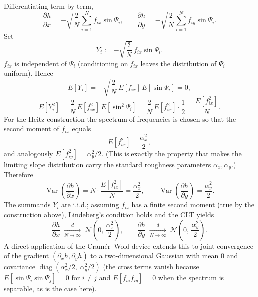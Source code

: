 \documentclass[a4paper,11pt]{article}
\begin{document}
Differentiating term by term,
\[
\frac{\partial h}{\partial x}
   = -\sqrt{\frac{2}{N}}\sum_{i=1}^N f_{ix}\sin\Psi_i,
\qquad
\frac{\partial h}{\partial y}
   = -\sqrt{\frac{2}{N}}\sum_{i=1}^N f_{iy}\sin\Psi_i.
\]
Set
\[
Y_i := -\sqrt{\frac{2}{N}}\,f_{ix}\sin\Psi_i.
\]
$f_{ix}$ is independent of $\Psi_i$ (conditioning on $f_{ix}$ leaves the
distribution of $\Psi_i$ uniform). Hence
\[
E[Y_i] = -\sqrt{\frac{2}{N}}\,E[f_{ix}]\,E[\sin\Psi_i] = 0,
\]
\[
E[Y_i^2] = \frac{2}{N}\,E[f_{ix}^2]\,E[\sin^2\Psi_i]
        = \frac{2}{N}\,E[f_{ix}^2]\cdot\frac{1}{2}
        = \frac{E[f_{ix}^2]}{N}.
\]
For the Heitz construction the spectrum of frequencies is chosen so that the
second moment of $f_{ix}$ equals
\[
E[f_{ix}^2] = \frac{\alpha_x^2}{2},
\]
and analogously $E[f_{iy}^2] = \alpha_y^2/2$. (This is exactly the property
that makes the limiting slope distribution carry the standard roughness
parameters $\alpha_x,\alpha_y$.) Therefore
\[
\operatorname{Var}\!\left(\frac{\partial h}{\partial x}\right)
   = N\cdot\frac{E[f_{ix}^2]}{N}
   = \frac{\alpha_x^2}{2},
\qquad
\operatorname{Var}\!\left(\frac{\partial h}{\partial y}\right)
   = \frac{\alpha_y^2}{2}.
\]
The summands $Y_i$ are i.i.d.; assuming $f_{ix}$ has a finite second moment
(true by the construction above), Lindeberg's condition holds and the CLT
yields
\[
\frac{\partial h}{\partial x}
   \;\xrightarrow[N\to\infty]{d}\;
   \mathcal{N}\!\left(0,\,\frac{\alpha_x^2}{2}\right),
\qquad
\frac{\partial h}{\partial y}
   \;\xrightarrow[N\to\infty]{d}\;
   \mathcal{N}\!\left(0,\,\frac{\alpha_y^2}{2}\right).
\]
A direct application of the Cramér--Wold device extends this to joint
convergence of the gradient $(\partial_x h,\partial_y h)$ to a two-dimensional
Gaussian with mean $0$ and covariance
\(
\operatorname{diag}(\alpha_x^2/2,\;\alpha_y^2/2)
\)
(the cross terms vanish because
$E[\sin\Psi_i\sin\Psi_j]=0$ for $i\neq j$ and
$E[f_{ix}f_{iy}]=0$ when the spectrum is separable, as is the case here).
\end{document}
